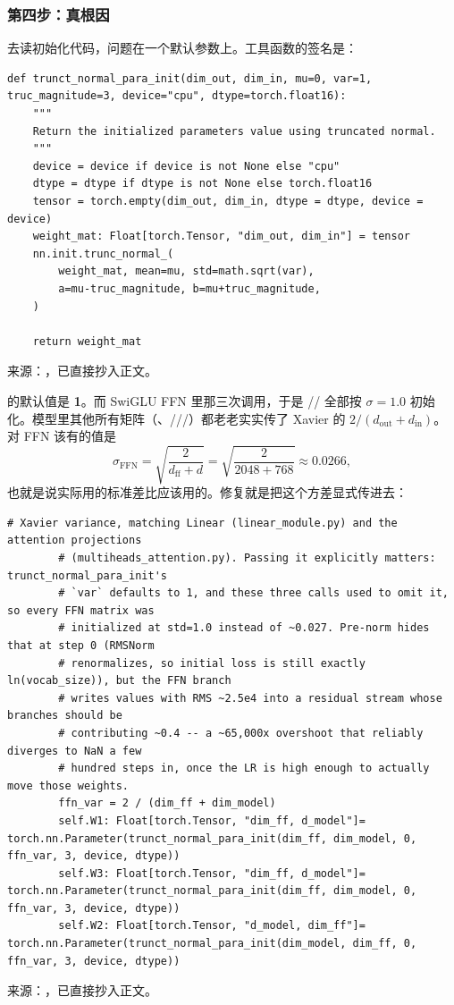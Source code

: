 \subsubsection*{第四步：真根因}

去读初始化代码，问题在一个默认参数上。工具函数的签名是：

\begin{lstlisting}[style=hlnum, firstnumber=6]
def trunct_normal_para_init(dim_out, dim_in, mu=0, var=1, truc_magnitude=3, device="cpu", dtype=torch.float16):
    """
    Return the initialized parameters value using truncated normal.
    """
    device = device if device is not None else "cpu"
    dtype = dtype if dtype is not None else torch.float16 
    tensor = torch.empty(dim_out, dim_in, dtype = dtype, device = device)
    weight_mat: Float[torch.Tensor, "dim_out, dim_in"] = tensor 
    nn.init.trunc_normal_(
        weight_mat, mean=mu, std=math.sqrt(var), 
        a=mu-truc_magnitude, b=mu+truc_magnitude,
    )

    return weight_mat
\end{lstlisting}
\noindent 来源：，已直接抄入正文。

 的默认值是 \textbf{1}。而 SwiGLU FFN 里那三次调用，于是 // 全部按 $\sigma=1.0$ 初始化。模型里其他所有矩阵（、///）都老老实实传了 Xavier 的 $2/(d_{\mathrm{out}}+d_{\mathrm{in}})$。对 FFN 该有的值是
\[
\sigma_{\mbox{FFN}} = \sqrt{\frac{2}{d_{\mathrm{ff}} + d}} = \sqrt{\frac{2}{2048+768}} \approx 0.0266 ,
\]
也就是说实际用的标准差比应该用的。修复就是把这个方差显式传进去：

\begin{lstlisting}[style=hlnum, firstnumber=13]
        # Xavier variance, matching Linear (linear_module.py) and the attention projections
        # (multiheads_attention.py). Passing it explicitly matters: trunct_normal_para_init's
        # `var` defaults to 1, and these three calls used to omit it, so every FFN matrix was
        # initialized at std=1.0 instead of ~0.027. Pre-norm hides that at step 0 (RMSNorm
        # renormalizes, so initial loss is still exactly ln(vocab_size)), but the FFN branch
        # writes values with RMS ~2.5e4 into a residual stream whose branches should be
        # contributing ~0.4 -- a ~65,000x overshoot that reliably diverges to NaN a few
        # hundred steps in, once the LR is high enough to actually move those weights.
        ffn_var = 2 / (dim_ff + dim_model)
        self.W1: Float[torch.Tensor, "dim_ff, d_model"]= torch.nn.Parameter(trunct_normal_para_init(dim_ff, dim_model, 0, ffn_var, 3, device, dtype))
        self.W3: Float[torch.Tensor, "dim_ff, d_model"]= torch.nn.Parameter(trunct_normal_para_init(dim_ff, dim_model, 0, ffn_var, 3, device, dtype))
        self.W2: Float[torch.Tensor, "d_model, dim_ff"]= torch.nn.Parameter(trunct_normal_para_init(dim_model, dim_ff, 0, ffn_var, 3, device, dtype))
\end{lstlisting}
\noindent 来源：，已直接抄入正文。

